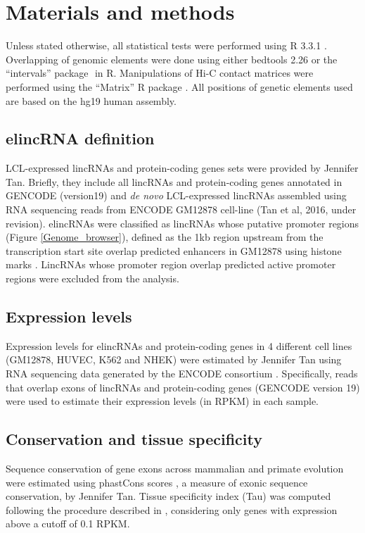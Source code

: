 \documentclass[11pt,a4paper]{report}
\begin{document}
\section*{Materials and methods}
Unless stated otherwise, all statistical tests were performed using R 3.3.1 \cite{RCoreTeam2016}⁠. Overlapping of genomic elements were done using either bedtools 2.26 \cite{Quinlan2010}⁠or the “intervals” package \cite{Bourgon2015}⁠ in R. Manipulations of Hi-C contact matrices were performed using the “Matrix” R package \cite{Bates2016}⁠. All positions of genetic elements used are based on the hg19 human assembly.

\subsection*{elincRNA definition}

LCL-expressed lincRNAs and protein-coding genes sets were provided by Jennifer Tan. Briefly, they include all lincRNAs and protein-coding genes annotated in GENCODE (version19) and \textit{de novo} LCL-expressed lincRNAs assembled using RNA sequencing reads from ENCODE GM12878 cell-line (Tan et al, 2016, under revision). elincRNAs were classified as lincRNAs whose putative promoter regions (Figure \ref{Genome_browser}), defined as the 1kb region upstream from the transcription start site overlap predicted enhancers in GM12878 using histone marks \cite{ENCODEProject2012}⁠. LincRNAs whose promoter region overlap predicted active promoter regions were excluded from the analysis.

\subsection*{Expression levels}

Expression levels for elincRNAs and protein-coding genes in 4  different cell lines (GM12878, HUVEC, K562 and NHEK) were estimated by Jennifer Tan using RNA sequencing data generated by the ENCODE consortium \cite{ENCODEProject2012}. Specifically, reads that overlap exons of lincRNAs and protein-coding genes (GENCODE version 19) were used to estimate their expression levels (in RPKM) in each sample.

\subsection*{Conservation and tissue specificity}

Sequence conservation of gene exons across mammalian and primate evolution were estimated using phastCons scores \cite{Siepel2005}⁠, a measure of exonic sequence conservation, by Jennifer Tan. Tissue specificity index (Tau) was computed following the procedure described in \cite{Kryuchkova2015a}, considering only genes with expression above a cutoff of 0.1 RPKM.
\end{document}
